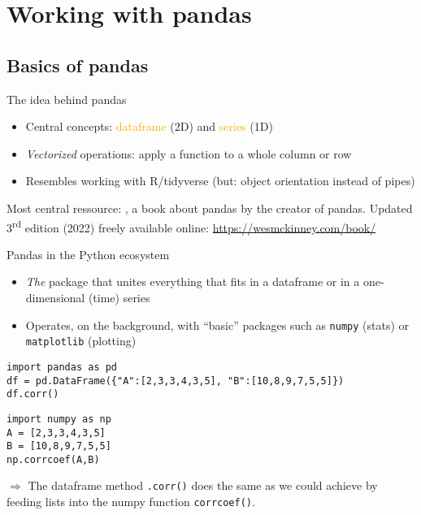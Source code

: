 \section{Working with pandas}

\subsection{Basics of pandas}

\begin{frame}{The idea behind pandas}
  \begin{itemize}
  \item Central concepts: \textcolor{orange}{dataframe} (2D) and \textcolor{orange}{series} (1D)
  \item \emph{Vectorized} operations: apply a function to a whole column or row
  \item Resembles working with R/tidyverse (but: object orientation instead of pipes)
  \end{itemize}
  \pause
Most central ressource: \textcite{McKinney2012}, a book about pandas by the creator of pandas. Updated 3\textsuperscript{rd} edition (2022) freely available online: \url{https://wesmckinney.com/book/}
\end{frame}


\begin{frame}[fragile]{Pandas in the Python ecosystem}
  \begin{itemize}
  \item \emph{The} package that unites everything that fits in a dataframe or in a one-dimensional (time) series
  \item Operates, on the background, with ``basic'' packages such as \texttt{numpy} (stats) or \texttt{matplotlib} (plotting)
  \end{itemize}

\begin{verbatim}
import pandas as pd
df = pd.DataFrame({"A":[2,3,3,4,3,5], "B":[10,8,9,7,5,5]})
df.corr()
\end{verbatim}
\vspace{-1cm}
\begin{verbatim}
import numpy as np
A = [2,3,3,4,3,5]
B = [10,8,9,7,5,5]
np.corrcoef(A,B)
\end{verbatim}

$\Rightarrow$ The dataframe method \texttt{.corr()} does the same as we could achieve by feeding lists into the numpy function \texttt{corrcoef()}.
\end{frame}




